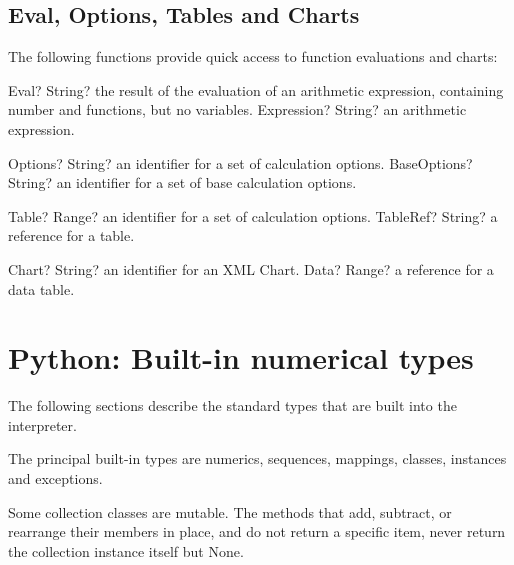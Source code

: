 \newpage
\section{Eval, Options, Tables and Charts}

The following functions provide quick access to function evaluations and charts:

\vspace{0.3cm}
\begin{mpFunctionsExtract}
	\mpFunctionOne
	{Eval? String?  the result of the evaluation of an arithmetic expression, containing number and functions, but no variables.}
	{Expression? String? an arithmetic expression.}
\end{mpFunctionsExtract}


\vspace{0.3cm}
\begin{mpFunctionsExtract}
	\mpFunctionOne
	{Options? String?  an identifier for a set of calculation options.}
	{BaseOptions? String? an identifier for a set of base calculation options.}
\end{mpFunctionsExtract}


\vspace{0.3cm}
\begin{mpFunctionsExtract}
	\mpFunctionOne
	{Table? Range?  an identifier for a set of calculation options.}
	{TableRef? String? a reference for a table.}
\end{mpFunctionsExtract}


\vspace{0.3cm}
\begin{mpFunctionsExtract}
	\mpFunctionOne
	{Chart? String?  an identifier for an XML Chart.}
	{Data? Range? a reference for a data table.}
\end{mpFunctionsExtract}




\chapter{Python: Built-in numerical types}


The following sections describe the standard types that are built into the interpreter.

The principal built-in types are numerics, sequences, mappings, classes, instances and exceptions.

Some collection classes are mutable. The methods that add, subtract, or rearrange their members in place, and do not return a specific item, never return the collection instance itself but None.

